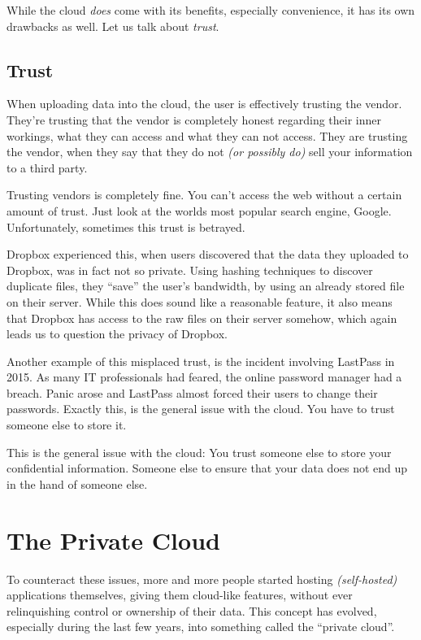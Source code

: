 		While the cloud \emph{does} come with its benefits, especially convenience, it has its own drawbacks as well. Let us talk about \emph{trust}.

		\subsection*{Trust}
			When uploading data into the cloud, the user is effectively trusting the vendor. They're trusting that the vendor is completely honest regarding their inner workings, what they can access and what they can not access. They are trusting the vendor, when they say that they do not \emph{(or possibly do)} sell your information to a third party.

			Trusting vendors is completely fine. You can't access the web without a certain amount of trust. Just look at the worlds most popular search engine, Google. Unfortunately, sometimes this trust is betrayed.

			Dropbox experienced this, when users discovered that the data they uploaded to Dropbox, was in fact not so private. Using hashing techniques to discover duplicate files, they ``save'' the user's bandwidth, by using an already stored file on their server. While this does sound like a reasonable feature, it also means that Dropbox has access to the raw files on their server somehow, which again leads us to question the privacy of Dropbox.

			Another example of this misplaced trust, is the incident involving LastPass in 2015. As many IT professionals had feared, the online password manager had a breach. Panic arose and LastPass almost forced their users to change their passwords. Exactly this, is the general issue with the cloud. You have to trust someone else to store it.

			This is the general issue with the cloud: You trust someone else to store your confidential information. Someone else to ensure that your data does not end up in the hand of someone else.

	\section{The Private Cloud}
		To counteract these issues, more and more people started hosting \emph{(self-hosted)} applications themselves, giving them cloud-like features, without ever relinquishing control or ownership of their data. This concept has evolved, especially during the last few years, into something called the ``private cloud''. 

